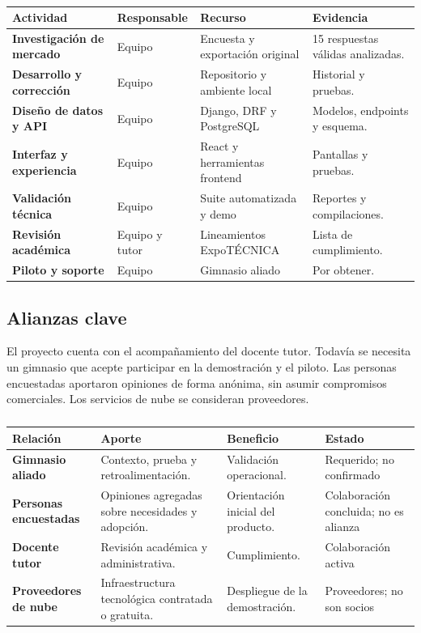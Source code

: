 \begin{table}[htbp]
\caption{Actividades, responsables y evidencia}
\begin{tabularx}{\textwidth}{>{\bfseries}p{3.5cm}p{2.7cm}X X}
\toprule
Actividad & Responsable & Recurso & Evidencia \\
\midrule
Investigación de mercado & Equipo & Encuesta y exportación original & 15 respuestas válidas analizadas. \\
Desarrollo y corrección & Equipo & Repositorio y ambiente local & Historial y pruebas. \\
Diseño de datos y API & Equipo & Django, DRF y PostgreSQL & Modelos, endpoints y esquema. \\
Interfaz y experiencia & Equipo & React y herramientas frontend & Pantallas y pruebas. \\
Validación técnica & Equipo & Suite automatizada y demo & Reportes y compilaciones. \\
Revisión académica & Equipo y tutor & Lineamientos ExpoTÉCNICA & Lista de cumplimiento. \\
Piloto y soporte & Equipo & Gimnasio aliado & Por obtener. \\
\bottomrule
\end{tabularx}
\caption*{\fuentepropia}
\end{table}

\subsection{Alianzas clave}

El proyecto cuenta con el acompañamiento del docente tutor. Todavía se necesita
un gimnasio que acepte participar en la demostración y el piloto. Las personas
encuestadas aportaron opiniones de forma anónima, sin asumir compromisos
comerciales. Los servicios de nube se consideran proveedores.

\begin{table}[htbp]
\caption{Colaboraciones, proveedores y alianzas requeridas}
\begin{tabularx}{\textwidth}{>{\bfseries}p{3.4cm}X X p{2.3cm}}
\toprule
Relación & Aporte & Beneficio & Estado \\
\midrule
Gimnasio aliado & Contexto, prueba y retroalimentación. & Validación operacional. & Requerido; no confirmado \\
Personas encuestadas & Opiniones agregadas sobre necesidades y adopción. & Orientación inicial del producto. & Colaboración concluida; no es alianza \\
Docente tutor & Revisión académica y administrativa. & Cumplimiento. & Colaboración activa \\
Proveedores de nube & Infraestructura tecnológica contratada o gratuita. & Despliegue de la demostración. & Proveedores; no son socios \\
\bottomrule
\end{tabularx}
\caption*{\fuentepropia}
\end{table}

